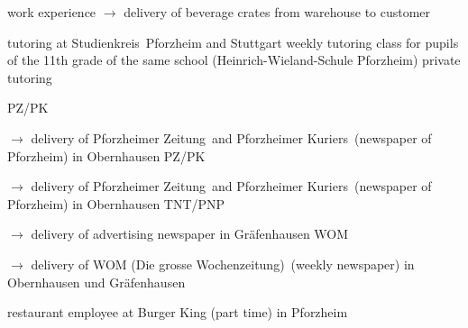 \begin{rubric}{\textcolor{black!20!blue!100}{work experience}}
			\setlength{\hangindent}{\widthof{$\rightarrow$ }}
			$\rightarrow$ delivery of beverage crates from warehouse to customer
				
		\entry*[10/2015 --- 01/2016]
			tutoring at \glqq Studienkreis\grqq\ Pforzheim and Stuttgart
		\entry*[10/2011 --- 06/2012]
			weekly tutoring class for pupils of the 11th grade of the same school (Heinrich-Wieland-Schule Pforzheim)
		\entry*[\phantom{10/}2010 --- 2016]
			private tutoring
			
		\entry*[08/2015 --- 09/2015]
			PZ/PK
			
			\setlength{\hangindent}{\widthof{$\rightarrow$ }}
			$\rightarrow$ delivery of \glqq Pforzheimer Zeitung\grqq\ and \glqq Pforzheimer Kuriers\grqq\ (newspaper of Pforzheim) in Obernhausen
		\entry*[08/2012 --- 09/2012]
			PZ/PK
			
			\setlength{\hangindent}{\widthof{$\rightarrow$ }}
			$\rightarrow$ delivery of \glqq Pforzheimer Zeitung\grqq\ and \glqq Pforzheimer Kuriers\grqq\ (newspaper of Pforzheim) in Obernhausen
		\entry*[06/2009 --- 10/2010]
			TNT/PNP
			
			\setlength{\hangindent}{\widthof{$\rightarrow$ }}
			$\rightarrow$ delivery of advertising newspaper in Gräfenhausen
		\entry*[06/2007 --- 12/2008]
			WOM
			
			\setlength{\hangindent}{\widthof{$\rightarrow$ }}
			$\rightarrow$ delivery of \glqq WOM (Die grosse Wochenzeitung)\grqq\ (weekly newspaper) in Obernhausen und Gräfenhausen
			
		\entry*[04/2012 --- 10/2012]
			restaurant employee at Burger King (part time) in Pforzheim
\end{rubric}
\versionLanguageEnd